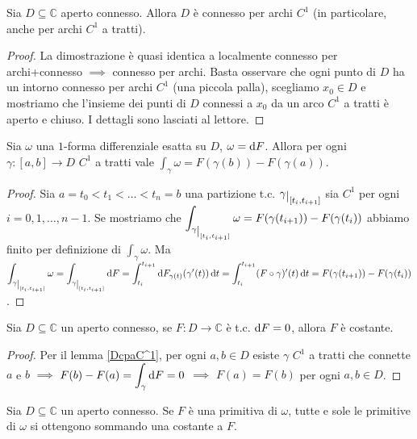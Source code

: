 \begin{lm} \label{DcpaC^1}
  Sia $D \subseteq \mathbb{C}$ aperto connesso. Allora $D$ è connesso per archi $C^1$ (in particolare, anche per archi $C^1$ a tratti).
\end{lm}

\begin{proof}
  La dimostrazione è quasi identica a localmente connesso per archi+connesso $\implies$ connesso per archi. Basta osservare che ogni punto di $D$ ha un intorno connesso per archi $C^1$ (una piccola palla), scegliamo $x_0 \in D$ e mostriamo che l'insieme dei punti di $D$ connessi a $x_0$ da un arco $C^1$ a tratti è aperto e chiuso. I dettagli sono lasciati al lettore.
\end{proof}

\begin{lm}
  Sia $\omega$ una $1$-forma differenziale esatta su $D$, $\omega=\mathop{}\!\mathrm{d} F$. Allora per ogni $\gamma:[a, b] \longrightarrow D$ $C^1$ a tratti vale $\displaystyle \int_{\gamma} \omega=F(\gamma(b))-F(\gamma(a))$.
\end{lm}

\begin{proof}
  Sia $a=t_0<t_1<\dots<t_n=b$ una partizione t.c. $\gamma\restrict{[t_i, t_{i+1}]}$ sia $C^1$ per ogni $i=0, 1, \dots, n-1$. Se mostriamo che $\displaystyle \int_{\gamma\restrict{[t_i, t_{i+1}]}} \omega=F(\gamma(t_{i+1}))-F(\gamma(t_i))$ abbiamo finito per definizione di $\displaystyle \int_{\gamma} \omega$.
  Ma $\displaystyle \int_{\gamma\restrict{[t_i, t_{i+1}]}} \omega=\int_{\gamma\restrict{[t_i, t_{i+1}]}} \diff F=\int_{t_i}^{t_{i+1}} \diff F_{\gamma(t)}(\gamma'(t))\diff t=\int_{t_i}^{t_{i+1}} (F \circ \gamma)'(t)\diff t=F(\gamma(t_{i+1}))-F(\gamma(t_i))$.
\end{proof}

\begin{cor}
  Sia $D \subseteq \mathbb{C}$ un aperto connesso, se $F:D \longrightarrow \mathbb{C}$ è t.c. $\mathop{}\!\mathrm{d} F=0$, allora $F$ è costante.
\end{cor}

\begin{proof}
  Per il lemma \ref{DcpaC^1}, per ogni $a, b \in D$ esiste $\gamma$ $C^1$ a tratti che connette $a$ e $b$ $\implies$ $\displaystyle F(b)-F(a)=\int_{\gamma} \mathop{}\!\mathrm{d} F=0$ $\implies$ $F(a)=F(b)$ per ogni $a, b \in D$.
\end{proof}

\begin{cor}
  Sia $D \subseteq \mathbb{C}$ un aperto connesso. Se $F$ è una primitiva di $\omega$, tutte e sole le primitive di $\omega$ si ottengono sommando una costante a $F$.
\end{cor}

